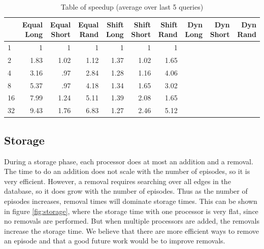 \documentclass[11pt]{article} %
\begin{document}
\begin{table}[h]
\caption{Table of speedup (average over last 5 queries)}
\centering
    \begin{tabular}{|l|r|r|r|r|r|r|r|r|r|}
        \hline
        ~  & Equal Long & Equal Short & Equal Rand & Shift Long & Shift Short & Shift Rand & Dyn Long & Dyn Short & Dyn Rand \\ \hline
        1  & 1          & 1                  & 1               & 1            & 1        & 1      & ~          & ~         & ~        \\  \hline
        2  & 1.83          & 1.02           & 1.12           & 1.37         & 1.02       & 1.65         & ~        & ~         & ~        \\ \hline
        4  & 3.16          & .97          & 2.84           & 1.28         & 1.16        & 4.06        & ~        & ~         & ~        \\ \hline
        8  & 5.37          & .97          & 4.18         & 1.34         & 1.65        & 3.02        & ~        & ~         & ~        \\ \hline
        16 & 7.99          & 1.24           & 5.11          & 1.39         & 2.08       & 1.65         & ~        & ~         & ~        \\ \hline
        32 & 9.43          & 1.76          & 6.83          & 1.27         & 2.46       & 5.12        & ~        & ~         & ~        \\
        \hline
    \end{tabular}
\end{table}

\subsection{Storage}

During a storage phase, each processor does at most an addition and a removal. The time
to do an addition does not scale with the number of episodes, so it is very efficient. However, 
a removal requires searching over all edges in the database, so it does grow with the number of 
episodes. Thus as the number of episodes increases, removal times will dominate storage times. 
This can be shown in figure \ref{fig:storage}, where the storage time with one processor is very flat, since
no removals are performed. But when multiple processors are added, the removals increase the
storage time. We believe that there are more efficient ways to remove an episode and that a 
good future work would be to improve removals. 
\end{document}

